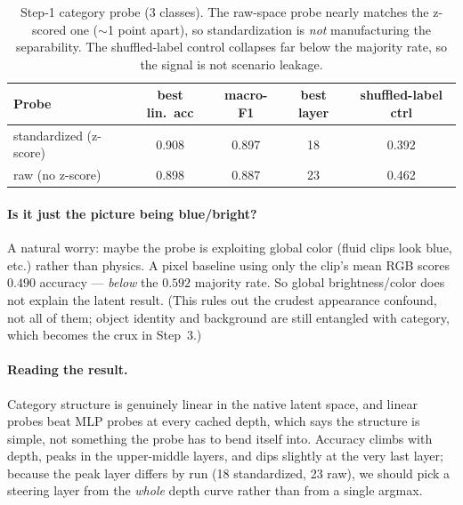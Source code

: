 \documentclass{article} %
\begin{document}
\begin{table}[h]
\caption{Step-1 category probe (3 classes). The raw-space probe nearly matches the z-scored one
($\sim$1 point apart), so standardization is \emph{not} manufacturing the separability. The
shuffled-label control collapses far below the majority rate, so the signal is not scenario leakage.}
\label{tab:step1}
\begin{center}
\begin{tabular}{lcccc}
\toprule
\textbf{Probe} & \textbf{best lin.\ acc} & \textbf{macro-F1} & \textbf{best layer} & \textbf{shuffled-label ctrl} \\
\midrule
standardized (z-score) & 0.908 & 0.897 & 18 & 0.392 \\
raw (no z-score)       & 0.898 & 0.887 & 23 & 0.462 \\
\bottomrule
\end{tabular}
\end{center}
\end{table}

\paragraph{Is it just the picture being blue/bright?}
A natural worry: maybe the probe is exploiting global color (fluid clips look blue, etc.) rather than
physics. A pixel baseline using only the clip's mean RGB scores $0.490$ accuracy --- \emph{below} the
$0.592$ majority rate. So global brightness/color does not explain the latent result. (This rules out
the crudest appearance confound, not all of them; object identity and background are still entangled
with category, which becomes the crux in Step~3.)

\paragraph{Reading the result.}
Category structure is genuinely linear in the native latent space, and linear probes beat MLP probes at
every cached depth, which says the structure is simple, not something the probe has to bend itself into.
Accuracy climbs with depth, peaks in the upper-middle layers, and dips slightly at the very last layer;
because the peak layer differs by run (18 standardized, 23 raw), we should pick a steering layer from
the \emph{whole} depth curve rather than from a single argmax.
\end{document}
